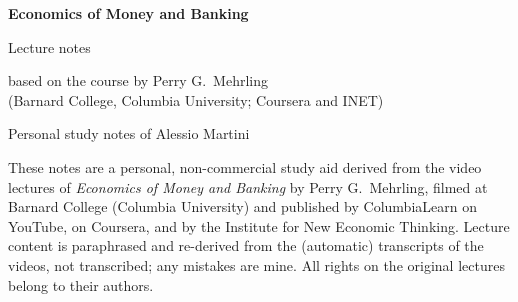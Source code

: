 \documentclass[12pt,oneside,openany]{book}
\begin{document}
\frontmatter
\begin{titlepage}
  \centering
  \vspace*{3cm}
  {\Huge\bfseries Economics of Money and Banking\par}
  \vspace{1cm}
  {\Large Lecture notes\par}
  \vspace{0.5cm}
  {\large based on the course by Perry G.~Mehrling\\(Barnard College, Columbia University;
  Coursera and INET)\par}
  \vspace{2cm}
  {\large Personal study notes of Alessio Martini\par}
  \vfill
  \begin{minipage}{0.85\textwidth}\small
    These notes are a personal, non-commercial study aid derived from the video lectures of
    \emph{Economics of Money and Banking} by Perry G.~Mehrling, filmed at Barnard College
    (Columbia University) and published by ColumbiaLearn on YouTube, on Coursera, and by the
    Institute for New Economic Thinking. Lecture content is paraphrased and re-derived from the
    (automatic) transcripts of the videos, not transcribed; any mistakes are mine. All rights on
    the original lectures belong to their authors.
  \end{minipage}
  \vspace{1cm}
\end{titlepage}
\end{document}
